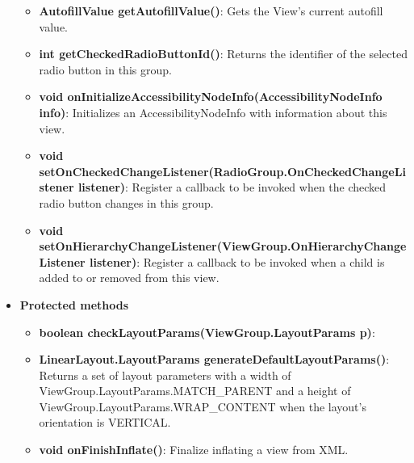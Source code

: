 \documentclass{report}
\begin{document}
\begin{itemize}
\begin{itemize}
                \item \textbf{AutofillValue	getAutofillValue()}: Gets the View's current autofill value.
                \item \textbf{int	getCheckedRadioButtonId()}: Returns the identifier of the selected radio button in this group.
                \item \textbf{void	onInitializeAccessibilityNodeInfo(AccessibilityNodeInfo info)}: Initializes an AccessibilityNodeInfo with information about this view.
                \item \textbf{void	setOnCheckedChangeListener(RadioGroup.OnCheckedChangeListener listener)}: Register a callback to be invoked when the checked radio button changes in this group.
                \item \textbf{void	setOnHierarchyChangeListener(ViewGroup.OnHierarchyChangeListener listener)}: Register a callback to be invoked when a child is added to or removed from this view.
            \end{itemize}
        \item \textbf{Protected methods}
            \begin{itemize}
                \item \textbf{boolean	checkLayoutParams(ViewGroup.LayoutParams p)}:
                \item \textbf{LinearLayout.LayoutParams	generateDefaultLayoutParams()}: Returns a set of layout parameters with a width of ViewGroup.LayoutParams.MATCH\_PARENT and a height of ViewGroup.LayoutParams.WRAP\_CONTENT when the layout's orientation is VERTICAL.
                \item \textbf{void	onFinishInflate()}: Finalize inflating a view from XML.
            \end{itemize}
       
    \end{itemize}

    \pagebreak 
\end{document}
